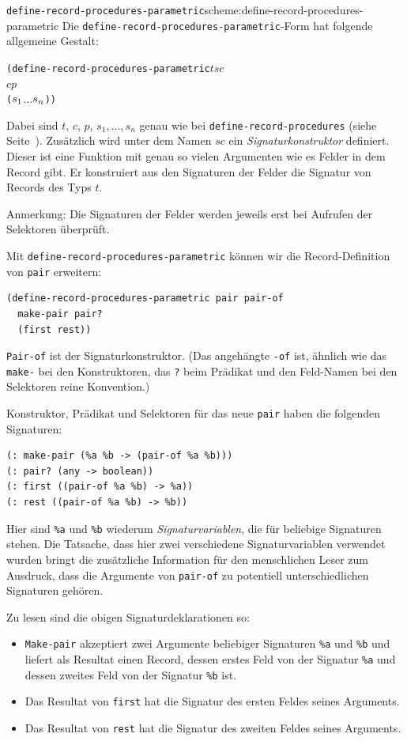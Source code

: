 \begin{feature}{\texttt{define-record-procedures-parametric}}{scheme:define-record-procedures-parametric}
%
Die \texttt{define-record-procedures-parametric}-Form hat folgende
allgemeine Gestalt:
\begin{alltt}
(define-record-procedures-parametric \(t\) \(\mathit{sc}\)
  \(c\) \(p\)
  (\(s\sb{1}\) \(\ldots\) \(s\sb{n}\)))
\end{alltt}
%
Dabei sind $t$, $c$, $p$, $s_1,\ldots, s_n$ genau wie bei
\texttt{define-record-procedures} (siehe
Seite~\pageref{def:define-record-procedures}).  Zusätzlich wird unter
dem Namen $\mathit{sc}$ ein
\textit{Signaturkonstruktor} definiert.
Dieser ist eine Funktion mit genau so vielen Argumenten wie es Felder in dem Record
gibt. Er konstruiert aus den Signaturen der Felder die Signatur von Records des Typs
$t$.

Anmerkung: Die Signaturen der Felder werden jeweils erst bei Aufrufen
der Selektoren überprüft.
\end{feature}

Mit
\texttt{define-record-procedures-parametric} können wir die
Record-Definition von \texttt{pair} erweitern:
%
\begin{verbatim}
(define-record-procedures-parametric pair pair-of
  make-pair pair?
  (first rest))
\end{verbatim}
%
\texttt{Pair-of} ist der Signaturkonstruktor.  (Das angehängte
\texttt{-of} ist, ähnlich wie das \texttt{make-} bei den
Konstruktoren, das \texttt{?} beim Prädikat und den Feld-Namen bei den
Selektoren reine Konvention.)

Konstruktor, Prädikat
und Selektoren für das neue \texttt{pair} haben die folgenden
Signaturen:
%
\begin{verbatim}
(: make-pair (%a %b -> (pair-of %a %b)))
(: pair? (any -> boolean))
(: first ((pair-of %a %b) -> %a))
(: rest ((pair-of %a %b) -> %b))
\end{verbatim}
%
Hier sind  \verb|%a| und \verb|%b| wiederum
\textit{Signaturvariablen}, die für beliebige
Signaturen stehen.  Die Tatsache, dass hier zwei verschiedene Signaturvariablen
verwendet wurden bringt die zusätzliche Information für den
menschlichen Leser zum Ausdruck, dass die
Argumente von \texttt{pair-of} zu potentiell
unterschiedlichen Signaturen gehören.

Zu lesen sind die obigen Signaturdeklarationen so:
%
\begin{itemize}
\item \texttt{Make-pair} akzeptiert zwei Argumente beliebiger Signaturen
  \verb|%a| und \verb|%b| und
  liefert als Resultat einen Record, dessen erstes Feld von der Signatur
  \verb|%a| und dessen zweites Feld von der Signatur \verb|%b| ist.
\item Das Resultat von \texttt{first} hat die
  Signatur des ersten Feldes seines Arguments.
\item Das Resultat von \texttt{rest} hat die
  Signatur des zweiten Feldes seines Arguments.
\end{itemize}
%

